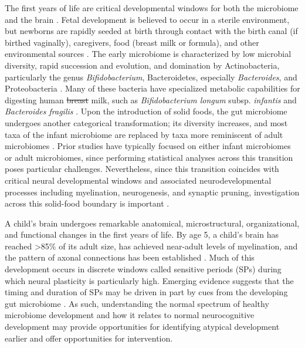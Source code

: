 \documentclass{article}
\providecommand{\DIFdel}[1]{{\protect\color{red}\sout{#1}}}                      %
\providecommand{\DIFdelbegin}{} %
\providecommand{\DIFdelend}{} %
\newcommand{\DIFscaledelfig}{0.5}
\newlength{\DIFdelgraphicswidth} %
\newlength{\DIFdelgraphicsheight} %
\newcommand{\DIFdelincludegraphics}[2][]{%
\sbox{\DIFdelgraphicsbox}{\DIFOincludegraphics[#1]{#2}}%
\settoboxwidth{\DIFdelgraphicswidth}{\DIFdelgraphicsbox} %
\settoboxtotalheight{\DIFdelgraphicsheight}{\DIFdelgraphicsbox} %
\scalebox{\DIFscaledelfig}{%
\parbox[b]{\DIFdelgraphicswidth}{\usebox{\DIFdelgraphicsbox}\\[-\baselineskip] \rule{\DIFdelgraphicswidth}{0em}}\llap{\resizebox{\DIFdelgraphicswidth}{\DIFdelgraphicsheight}{%
\setlength{\unitlength}{\DIFdelgraphicswidth}%
\begin{picture}(1,1)%
\thicklines\linethickness{2pt} %
{\color[rgb]{1,0,0}\put(0,0){\framebox(1,1){}}}%
{\color[rgb]{1,0,0}\put(0,0){\line( 1,1){1}}}%
{\color[rgb]{1,0,0}\put(0,1){\line(1,-1){1}}}%
\end{picture}%
}\hspace*{3pt}}} %
} %
\DeclareRobustCommand{\DIFdelbegin}{\DIFOdelbegin \let\includegraphics\DIFdelincludegraphics} %
\DeclareRobustCommand{\DIFdelend}{\DIFOaddend \let\includegraphics\DIFOincludegraphics} %
\begin{document}
The first years of life are critical developmental windows for both the
microbiome and the brain
\cite{laueDevelopingMicrobiomeBirth2022}.
Fetal development is believed to occur in a sterile environment, but newborns
are rapidly seeded at birth through contact with the birth canal (if
birthed vaginally), caregivers, food (breast milk or formula),
and other environmental sources
\cite{backhedDynamicsStabilizationHuman2015,bokulichAntibioticsBirthMode2016}.
The early microbiome is characterized by low microbial
diversity, rapid succession and evolution, and domination by
Actinobacteria, particularly the genus \emph{Bifidobacterium},
Bacteroidetes, especially \emph{Bacteroides}, and Proteobacteria
\cite{koenigSuccessionMicrobialConsortia2011}.
Many of these bacteria have specialized metabolic capabilities
for digesting human \DIFdelbegin \DIFdel{breast }\DIFdelend milk, such as \emph{Bifidobacterium longum}
subsp. \textit{infantis} and \emph{Bacteroides fragilis}
\cite{selaGenomeSequenceBifidobacterium2008}.
Upon the introduction of solid foods, the gut
microbiome undergoes another categorical transformation;
its diversity increases, and most taxa of the infant microbiome
are replaced by taxa more reminiscent of adult microbiomes
\cite{backhedDynamicsStabilizationHuman2015}.
Prior studies have typically focused on either infant microbiomes or
adult microbiomes, since performing statistical analyses across this
transition poses particular challenges. Nevertheless, since this
transition coincides with critical neural developmental windows and
associated neurodevelopmental processes including myelination, neurogenesis, and synaptic pruning,
investigation across this solid-food boundary is important
\cite{tauNormalDevelopmentBrain2010}.

A child's brain undergoes remarkable anatomical, microstructural,
organizational, and functional changes in the first years of life. By
age 5, a child's brain has reached \textgreater85\% of its adult size,
has achieved near-adult levels of myelination, and the pattern of axonal
connections has been established
\cite{silbereisCellularMolecularLandscapes2016}.
Much of this development occurs in discrete windows called
sensitive periods (SPs)
\cite{knudsenSensitivePeriodsDevelopment2004}
during which neural plasticity is particularly high.
Emerging evidence suggests that the timing and duration of SPs
may be driven in part by cues from the developing gut microbiome
\cite{callaghanNestedSensitivePeriods2020,cowanAnnualResearchReview2020}.
As such, understanding the normal spectrum of healthy microbiome
development and how it relates to normal neurocognitive development may
provide opportunities for identifying atypical development earlier and
offer opportunities for intervention.
\end{document}
